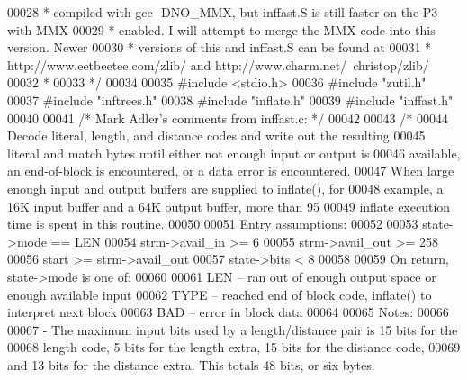 \begin{DoxyCode}
{00028 \textcolor{comment}{ * compiled with gcc -DNO\_MMX, but inffast.S is still faster on the P3 with MMX}
00029 \textcolor{comment}{ * enabled.  I will attempt to merge the MMX code into this version.  Newer}
00030 \textcolor{comment}{ * versions of this and inffast.S can be found at}
00031 \textcolor{comment}{ * http://www.eetbeetee.com/zlib/ and http://www.charm.net/~christop/zlib/}
00032 \textcolor{comment}{ *}
00033 \textcolor{comment}{ */}
00034 
00035 \textcolor{preprocessor}{#include <stdio.h>}
00036 \textcolor{preprocessor}{#include "zutil.h"}
00037 \textcolor{preprocessor}{#include "inftrees.h"}
00038 \textcolor{preprocessor}{#include "inflate.h"}
00039 \textcolor{preprocessor}{#include "inffast.h"}
00040 
00041 \textcolor{comment}{/* Mark Adler's comments from inffast.c: */}
00042 
00043 \textcolor{comment}{/*}
00044 \textcolor{comment}{   Decode literal, length, and distance codes and write out the resulting}
00045 \textcolor{comment}{   literal and match bytes until either not enough input or output is}
00046 \textcolor{comment}{   available, an end-of-block is encountered, or a data error is encountered.}
00047 \textcolor{comment}{   When large enough input and output buffers are supplied to inflate(), for}
00048 \textcolor{comment}{   example, a 16K input buffer and a 64K output buffer, more than 95%
00049 \textcolor{comment}{   inflate execution time is spent in this routine.}
00050 \textcolor{comment}{}
00051 \textcolor{comment}{   Entry assumptions:}
00052 \textcolor{comment}{}
00053 \textcolor{comment}{        state->mode == LEN}
00054 \textcolor{comment}{        strm->avail\_in >= 6}
00055 \textcolor{comment}{        strm->avail\_out >= 258}
00056 \textcolor{comment}{        start >= strm->avail\_out}
00057 \textcolor{comment}{        state->bits < 8}
00058 \textcolor{comment}{}
00059 \textcolor{comment}{   On return, state->mode is one of:}
00060 \textcolor{comment}{}
00061 \textcolor{comment}{        LEN -- ran out of enough output space or enough available input}
00062 \textcolor{comment}{        TYPE -- reached end of block code, inflate() to interpret next block}
00063 \textcolor{comment}{        BAD -- error in block data}
00064 \textcolor{comment}{}
00065 \textcolor{comment}{   Notes:}
00066 \textcolor{comment}{}
00067 \textcolor{comment}{    - The maximum input bits used by a length/distance pair is 15 bits for the}
00068 \textcolor{comment}{      length code, 5 bits for the length extra, 15 bits for the distance code,}
00069 \textcolor{comment}{      and 13 bits for the distance extra.  This totals 48 bits, or six bytes.}
}}
\end{DoxyCode}
